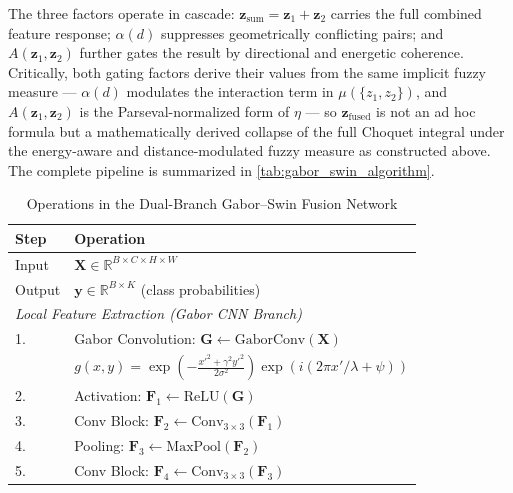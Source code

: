 \documentclass[preprint,12pt]{elsarticle}
\begin{document}
The three factors operate in cascade: $\mathbf{z}_{\text{sum}} = \mathbf{z}_1+\mathbf{z}_2$ carries the full combined feature response; $\alpha(d)$ suppresses geometrically conflicting pairs; and $A(\mathbf{z}_1,\mathbf{z}_2)$ further gates the result by directional and energetic coherence. Critically, both gating factors derive their values from the same implicit fuzzy measure — $\alpha(d)$ modulates the interaction term in $\mu(\{z_1,z_2\})$, and $A(\mathbf{z}_1,\mathbf{z}_2)$ is the Parseval-normalized form of $\eta$ — so $\mathbf{z}_{\text{fused}}$ is not an ad hoc formula but a mathematically derived collapse of the full Choquet integral under the energy-aware and distance-modulated fuzzy measure as constructed above. The complete pipeline is summarized in \autoref{tab:gabor_swin_algorithm}.

\begin{table}[h]
\centering
\caption{Operations in the Dual-Branch Gabor--Swin Fusion Network}
\label{tab:gabor_swin_algorithm}
\footnotesize
\setlength{\tabcolsep}{3pt}
\renewcommand{\arraystretch}{0.9}
\begin{tabular}{@{}ll@{}}
\toprule
\textbf{Step} & \textbf{Operation} \\
\midrule

Input & $\mathbf{X} \in \mathbb{R}^{B \times C \times H \times W}$ \\
Output & $\mathbf{y} \in \mathbb{R}^{B \times K}$ (class probabilities) \\

\midrule
\multicolumn{2}{l}{\textit{Local Feature Extraction (Gabor CNN Branch)}} \\

1. & Gabor Convolution: $\mathbf{G} \leftarrow \text{GaborConv}(\mathbf{X})$ \\

 & \quad $g(x,y)=\exp\!\left(-\frac{x'^2+\gamma^2y'^2}{2\sigma^2}\right)
      \exp\!\left(i(2\pi x'/\lambda+\psi)\right)$ \\

2. & Activation: $\mathbf{F}_1 \leftarrow \text{ReLU}(\mathbf{G})$ \\

3. & Conv Block: $\mathbf{F}_2 \leftarrow \text{Conv}_{3\times3}(\mathbf{F}_1)$ \\

4. & Pooling: $\mathbf{F}_3 \leftarrow \text{MaxPool}(\mathbf{F}_2)$ \\

5. & Conv Block: $\mathbf{F}_4 \leftarrow \text{Conv}_{3\times3}(\mathbf{F}_3)$ \\


\end{tabular}
\end{table}
\end{document}
